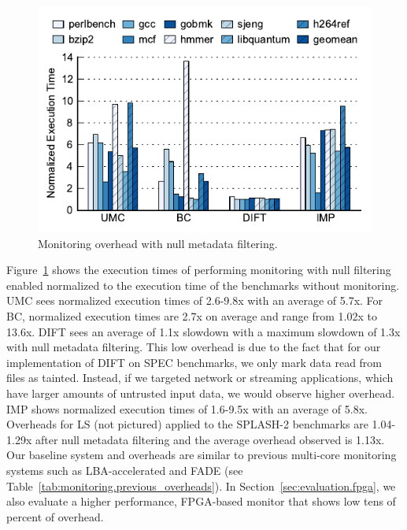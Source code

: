 \begin{figure}
  \begin{center}
    \includegraphics[width=\columnwidth]{figs/data_filtering.pdf}
    \vspace{-0.2in}
    \caption{Monitoring overhead with null metadata filtering.}
    \label{fig:evaluation.filtering}
    \vspace{-0.1in}
  \end{center}
\end{figure}

Figure~\ref{fig:evaluation.filtering} shows the
execution times of performing monitoring with null filtering enabled normalized
to the execution time of the benchmarks without monitoring. UMC sees normalized
execution times of 2.6-9.8x with an average of 5.7x.
For BC, normalized execution times
are 2.7x on average and range from 1.02x to 13.6x.
DIFT sees an average of 1.1x slowdown with a maximum slowdown of 1.3x with null
metadata filtering. This low overhead is due to the fact
that for our implementation of DIFT on SPEC
benchmarks, we only mark data read from files as tainted. Instead, if we
targeted network or streaming applications, which have larger amounts of
untrusted input data, we would observe higher overhead. IMP shows normalized
execution times of 1.6-9.5x with an average of 5.8x. Overheads for LS (not pictured)
applied to the SPLASH-2 benchmarks are
1.04-1.29x after null metadata filtering and the average
overhead observed is 1.13x.
Our baseline system and overheads are similar to previous multi-core
monitoring systems such as LBA-accelerated \cite{lba-isca08} and FADE
\cite{fade-hpca14} (see
Table~\ref{tab:monitoring.previous_overheads}). In
Section~\ref{sec:evaluation.fpga}, we also evaluate a higher performance, FPGA-based
monitor that shows low tens of percent of overhead. 

